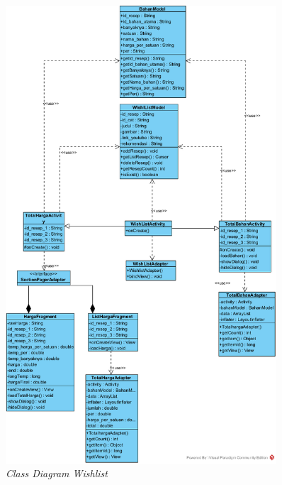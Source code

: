 		\begin{figure}[H]
			\centering
			\includegraphics[origin=c,width=0.9\textwidth]{gambar/class/Wishlist}
			\caption{\emph{Class Diagram Wishlist}}
			\label{Class wishlist}
		\end{figure}

